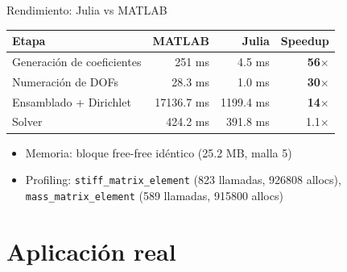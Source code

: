 \documentclass[aspectratio=169,11pt]{beamer}
\begin{document}
\begin{frame}{Rendimiento: Julia vs MATLAB}
  \begin{center}
  \footnotesize
  \begin{tabular}{lrrr}
    \toprule
    \textbf{Etapa} & \textbf{MATLAB} & \textbf{Julia} & \textbf{Speedup} \\
    \midrule
    Generación de coeficientes & 251 ms      & 4.5 ms      & \textbf{56$\times$} \\
    Numeración de DOFs         & 28.3 ms     & 1.0 ms      & \textbf{30$\times$} \\
    Ensamblado + Dirichlet     & 17136.7 ms  & 1199.4 ms   & \textbf{14$\times$} \\
    Solver                     & 424.2 ms    & 391.8 ms    & 1.1$\times$ \\
    \bottomrule
  \end{tabular}
  \end{center}

  \vspace{3mm}
  \begin{itemize}
    \item Memoria: bloque free-free idéntico (25.2 MB, malla 5)
    \item Profiling: \texttt{stiff\_matrix\_element} (823 llamadas, 926808 allocs),
          \texttt{mass\_matrix\_element} (589 llamadas, 915800 allocs)
  \end{itemize}
\end{frame}

\section{Aplicación real}
\end{document}
